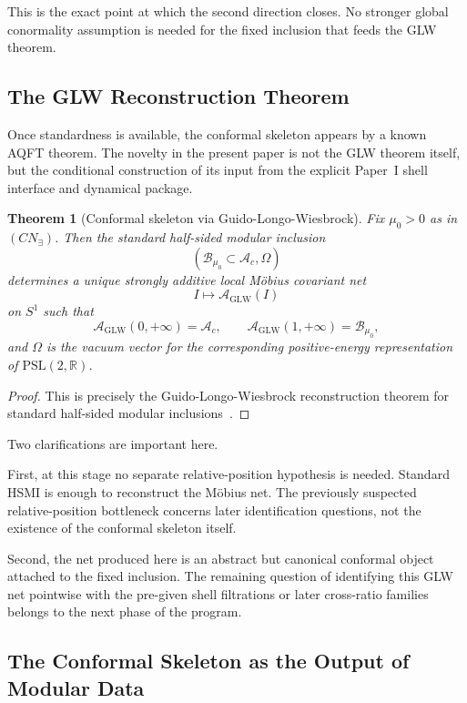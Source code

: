 \documentclass[12pt]{article}
\newtheorem{theorem}{Theorem}[section]
\theoremstyle{definition}
\theoremstyle{remark}
\begin{document}
This is the exact point at which the second direction closes. No
stronger global conormality assumption is needed for the fixed inclusion
that feeds the GLW theorem.

\subsection{The GLW Reconstruction
Theorem}\label{the-glw-reconstruction-theorem}

Once standardness is available, the conformal skeleton appears by a
known AQFT theorem. The novelty in the present paper is not the GLW
theorem itself, but the conditional construction of its input from the
explicit Paper~I shell interface and dynamical package.

\begin{theorem}[Conformal skeleton via Guido-Longo-Wiesbrock]\label{thm:4.7}
Fix \(\mu_0>0\) as in \((CN_\exists)\). Then the standard half-sided
modular inclusion \[
(\mathcal{B}_{\mu_0}\subset \mathcal{A}_c,\Omega)
\] determines a unique strongly additive local Möbius covariant net \[
I\longmapsto \mathcal{A}_{\mathrm{GLW}}(I)
\] on \(S^1\) such that \[
\mathcal{A}_{\mathrm{GLW}}(0,+\infty)=\mathcal{A}_c,
\qquad
\mathcal{A}_{\mathrm{GLW}}(1,+\infty)=\mathcal{B}_{\mu_0},
\] and \(\Omega\) is the vacuum vector for the corresponding
positive-energy representation of \(\mathrm{PSL}(2,\mathbb{R})\).
\end{theorem}

\begin{proof}
This is precisely the Guido-Longo-Wiesbrock reconstruction theorem for
standard half-sided modular inclusions~\cite{GLW1998}.
\end{proof}

Two clarifications are important here.

First, at this stage no separate relative-position hypothesis is needed.
Standard HSMI is enough to reconstruct the Möbius net. The previously
suspected relative-position bottleneck concerns later identification
questions, not the existence of the conformal skeleton itself.

Second, the net produced here is an abstract but canonical conformal
object attached to the fixed inclusion. The remaining question of
identifying this GLW net pointwise with the pre-given shell filtrations
or later cross-ratio families belongs to the next phase of the program.

\subsection{The Conformal Skeleton as the Output of Modular
Data}\label{the-conformal-skeleton-as-the-output-of-modular-data}
\end{document}
